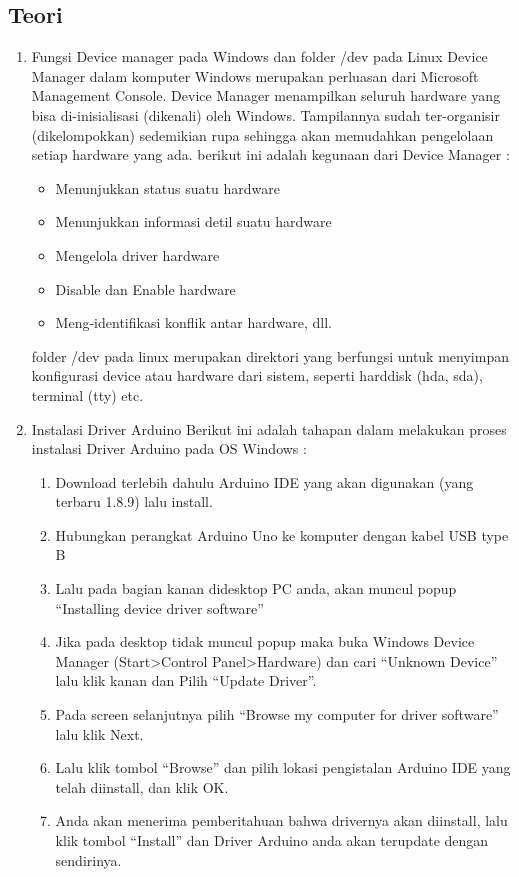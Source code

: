 \subsection{Teori}
\begin{enumerate}
\item Fungsi Device manager pada Windows dan folder /dev pada Linux
\subitem Device Manager dalam komputer Windows merupakan perluasan dari Microsoft Management Console. Device Manager menampilkan seluruh hardware yang bisa di-inisialisasi (dikenali) oleh Windows. Tampilannya sudah ter-organisir (dikelompokkan) sedemikian rupa sehingga akan memudahkan pengelolaan setiap hardware yang ada. berikut ini adalah kegunaan dari Device Manager :
\begin{itemize}
\item Menunjukkan status suatu hardware
\item Menunjukkan informasi detil suatu hardware
\item Mengelola driver hardware
\item Disable dan Enable hardware
\item Meng-identifikasi konflik antar hardware, dll.
\end{itemize}

\subitem folder /dev pada linux merupakan direktori yang berfungsi untuk menyimpan konfigurasi device atau hardware dari sistem, seperti harddisk (hda, sda), terminal (tty) etc.

\item Instalasi Driver Arduino
\subitem Berikut ini adalah tahapan dalam melakukan proses instalasi Driver Arduino pada OS Windows :
\begin{enumerate}
\item Download terlebih dahulu Arduino IDE yang akan digunakan (yang terbaru 1.8.9) lalu install.
\item Hubungkan perangkat Arduino Uno ke komputer dengan kabel USB type B 
\item Lalu pada bagian kanan didesktop PC anda, akan muncul popup “Installing device driver software”
\item Jika pada desktop tidak muncul popup maka buka Windows Device Manager (Start>Control Panel>Hardware) dan cari “Unknown Device” lalu klik kanan dan Pilih “Update Driver”.
\item Pada screen selanjutnya pilih “Browse my computer for driver software” lalu klik Next.
\item Lalu klik tombol “Browse” dan pilih lokasi pengistalan Arduino IDE yang telah diinstall, dan klik OK.
\item Anda akan menerima pemberitahuan bahwa drivernya akan diinstall, lalu klik tombol “Install” dan Driver Arduino anda akan terupdate dengan sendirinya.
\end{enumerate}


\end{enumerate}
